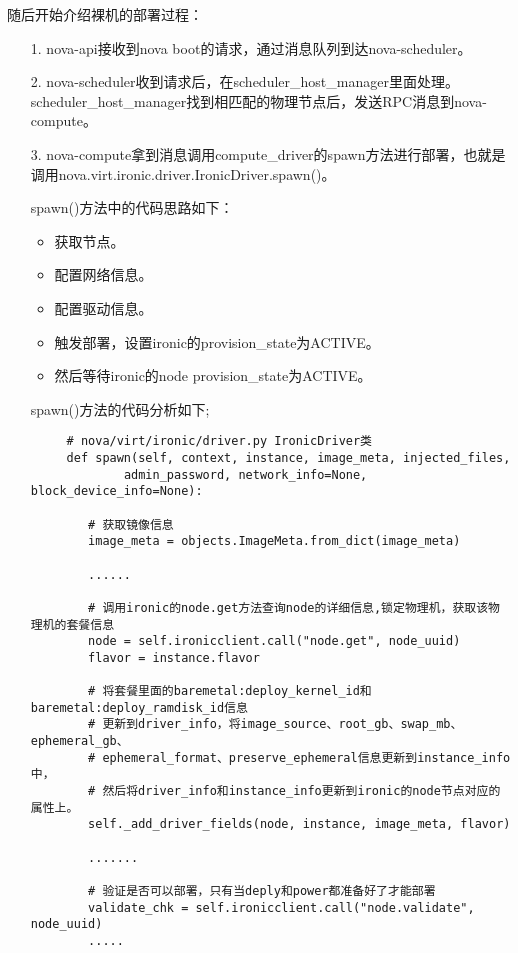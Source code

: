 \documentclass[a4paper,left=1.5cm,right=1.5cm,11pt]{article}
\begin{document}
	随后开始介绍裸机的部署过程：
	\begin{itemize}
		\item[1.] nova-api接收到nova boot的请求，通过消息队列到达nova-scheduler。
		\item[2.] nova-scheduler收到请求后，在scheduler\_host\_manager里面处理。
				  scheduler\_host\_manager找到相匹配的物理节点后，发送RPC消息到nova-compute。
		\item[3.] nova-compute拿到消息调用compute\_driver的spawn方法进行部署，也就是调用nova.virt.ironic.driver.IronicDriver.spawn()。\par

		spawn()方法中的代码思路如下：
		\begin{itemize}
			\item 获取节点。
			\item 配置网络信息。
			\item 配置驱动信息。
			\item 触发部署，设置ironic的provision\_state为ACTIVE。
			\item 然后等待ironic的node provision\_state为ACTIVE。
		\end{itemize}

		spawn()方法的代码分析如下;
		\begin{lstlisting}
	 # nova/virt/ironic/driver.py IronicDriver类
	 def spawn(self, context, instance, image_meta, injected_files,  
             admin_password, network_info=None, block_device_info=None):  

        # 获取镜像信息
        image_meta = objects.ImageMeta.from_dict(image_meta)

        ......

        # 调用ironic的node.get方法查询node的详细信息,锁定物理机，获取该物理机的套餐信息
        node = self.ironicclient.call("node.get", node_uuid)
        flavor = instance.flavor

        # 将套餐里面的baremetal:deploy_kernel_id和baremetal:deploy_ramdisk_id信息
        # 更新到driver_info，将image_source、root_gb、swap_mb、ephemeral_gb、
        # ephemeral_format、preserve_ephemeral信息更新到instance_info中，
        # 然后将driver_info和instance_info更新到ironic的node节点对应的属性上。
        self._add_driver_fields(node, instance, image_meta, flavor)

        .......

        # 验证是否可以部署，只有当deply和power都准备好了才能部署
        validate_chk = self.ironicclient.call("node.validate", node_uuid)
        .....


\end{lstlisting}
\end{itemize}
\end{document}
